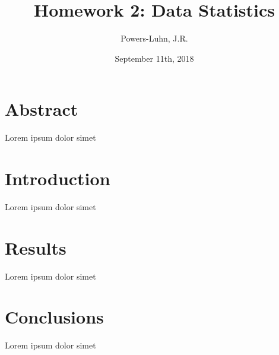 \documentclass{IEEEtran}
\author{Powers-Luhn, J.R.}
\title{Homework 2: Data Statistics}
\date{September 11th, 2018}
\begin{document}
\maketitle

\section{Abstract}
Lorem ipsum dolor simet \cite{1985Gbcp}

\section{Introduction}
Lorem ipsum dolor simet

\section{Results}
Lorem ipsum dolor simet

\section{Conclusions}
Lorem ipsum dolor simet

\nocite{*}
\printbibliography
\end{document}
